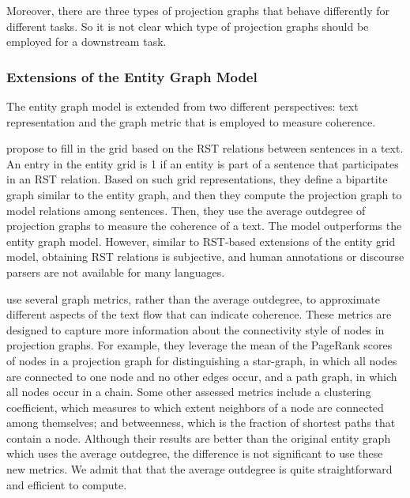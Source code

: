 Moreover, there are three types of projection graphs that behave differently for different tasks. 
So it is not clear which type of projection graphs should be employed for a downstream task. 

\subsubsection{Extensions of the Entity Graph Model}

The entity graph model is extended from two different perspectives: text representation and the graph metric that is employed to measure coherence. 

 propose to fill in the grid based on the RST relations between sentences in a text. 
An entry in the entity grid is 1 if an entity is part of a sentence that participates in an RST relation.
Based on such grid representations, they define a bipartite graph similar to the entity graph, and then they compute the projection graph to model relations among sentences. 
Then, they use the average outdegree of projection graphs to measure the coherence of a text. 
The model outperforms the entity graph model. 
However, similar to RST-based extensions of the entity grid model, obtaining RST relations is subjective, and human annotations or discourse parsers are not available for many languages. 

 use several graph metrics, rather than the average outdegree, to approximate different aspects of the text flow that can indicate coherence.  
These metrics are designed to capture more information about the connectivity style of nodes in projection graphs. 
For example, they leverage the mean of the PageRank scores \cite{newmanmark10} of nodes in a projection graph for distinguishing a star-graph, in which all nodes are connected to one node and no other edges occur, and a path graph, in which all nodes occur in a chain. 
Some other assessed metrics include a clustering coefficient, which measures to which extent neighbors of a node are connected among themselves; and betweenness, which is the fraction of shortest paths that contain a node. 
Although their results are better than the original entity graph which uses the average outdegree, the difference is not significant to use these new metrics. 
We admit that that the average outdegree is quite straightforward and efficient to compute. 

